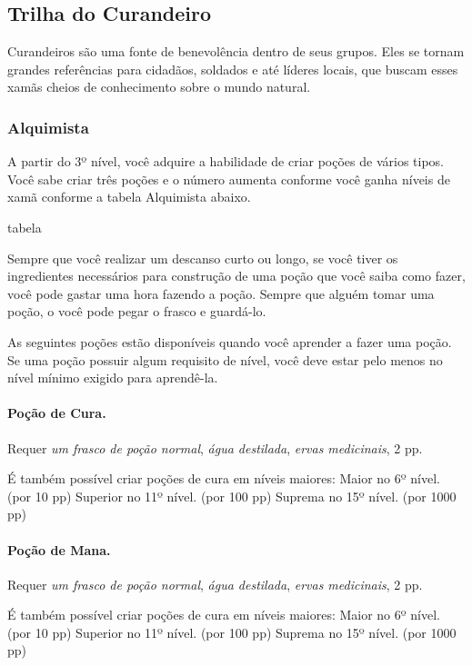 \begin{multicols}{2}
\subsection*{Trilha do Curandeiro}%

Curandeiros são uma fonte de benevolência dentro de seus grupos. Eles se tornam
grandes referências para cidadãos, soldados e até líderes locais, que buscam
esses xamãs cheios de conhecimento sobre o mundo natural.

\subsubsection*{Alquimista}%

A partir do 3º nível, você adquire a habilidade de criar poções de vários
tipos. Você sabe criar três poções e o número aumenta conforme você ganha níveis
de xamã conforme a tabela Alquimista abaixo.

tabela

Sempre que você realizar um descanso curto ou longo, se você tiver os
ingredientes necessários para construção de uma poção que você saiba como fazer,
você pode gastar uma hora fazendo a poção. Sempre que alguém tomar uma poção, o
você pode pegar o frasco e guardá-lo.

As seguintes poções estão disponíveis quando você aprender a fazer uma poção. Se
uma poção possuir algum requisito de nível, você deve estar pelo menos no nível
mínimo exigido para aprendê-la.

\paragraph{Poção de Cura.} %

Requer \textit{um frasco de poção normal}, \textit{água destilada},
\textit{ervas medicinais}, 2 pp.

É também possível criar poções de cura em níveis maiores: \nl
Maior no 6º nível. (por 10 pp) \nl
Superior no 11º nível. (por 100 pp) \nl
Suprema no 15º nível. (por 1000 pp) \nl

\paragraph{Poção de Mana.}%

Requer \textit{um frasco de poção normal}, \textit{água destilada},
\textit{ervas medicinais}, 2 pp.

É também possível criar poções de cura em níveis maiores: \nl
Maior no 6º nível. (por 10 pp) \nl
Superior no 11º nível. (por 100 pp) \nl
Suprema no 15º nível. (por 1000 pp) \nl


\end{multicols}
